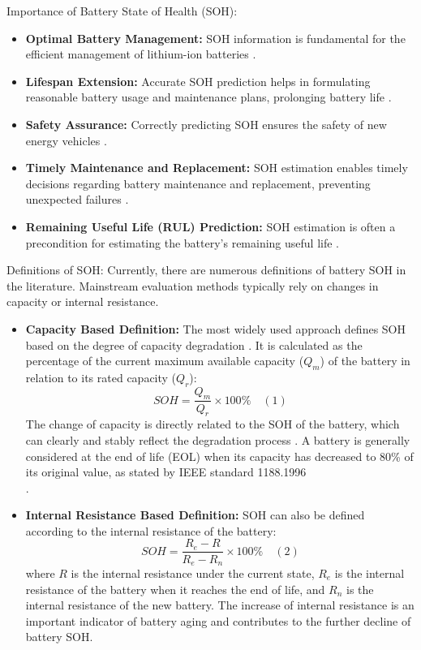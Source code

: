 Importance of Battery State of Health (SOH):
\begin{itemize}
    \item \textbf{Optimal Battery Management:} SOH information is fundamental for the efficient management of lithium-ion batteries \cite{105207_1_5.0172683}.
    \item \textbf{Lifespan Extension:} Accurate SOH prediction helps in formulating reasonable battery usage and maintenance plans, prolonging battery life \cite{electronics-13-01675}.
    \item \textbf{Safety Assurance:} Correctly predicting SOH ensures the safety of new energy vehicles \cite{electronics-13-01675}.
    \item \textbf{Timely Maintenance and Replacement:} SOH estimation enables timely decisions regarding battery maintenance and replacement, preventing unexpected failures \cite{105207_1_5.0172683}.
    \item \textbf{Remaining Useful Life (RUL) Prediction:} SOH estimation is often a precondition for estimating the battery's remaining useful life \cite{wevj-12-00120-v2}.
\end{itemize}

Definitions of SOH:
Currently, there are numerous definitions of battery SOH in the literature\cite{s41598-025-92262-8}. Mainstream evaluation methods typically rely on changes in capacity or internal resistance\cite{electronics-13-01675}.
\begin{itemize}
    \item \textbf{Capacity Based Definition:} The most widely used approach defines SOH based on the degree of capacity degradation \cite{s41598-025-92262-8}. It is calculated as the percentage of the current maximum available capacity ($Q_m$) of the battery in relation to its rated capacity ($Q_r$)\cite{electronics-13-01675}\cite{wevj-12-00113}: $$SOH = \frac{Q_m}{Q_r} \times 100\% \quad (1)$$ The change of capacity is directly related to the SOH of the battery, which can clearly and stably reflect the degradation process \cite{s41598-025-92262-8}. A battery is generally considered at the end of life (EOL) when its capacity has decreased to 80\% of its original value, as stated by IEEE standard 1188.1996\\ \cite{wevj-12-00113}\cite{energies-18-00342-v2}.
    \item \textbf{Internal Resistance Based Definition:}  SOH can also be defined according to the internal resistance of the battery\cite{wevj-12-00113}: $$SOH = \frac{R_e - R}{R_e - R_n} \times 100\% \quad (2)$$ where $R$ is the internal resistance under the current state, $R_e$ is the internal resistance of the battery when it reaches the end of life, and $R_n$ is the internal resistance of the new battery\cite{wevj-12-00113}. The increase of internal resistance is an important indicator of battery aging and contributes to the further decline of battery SOH\cite{wevj-12-00113}.
\end{itemize}

